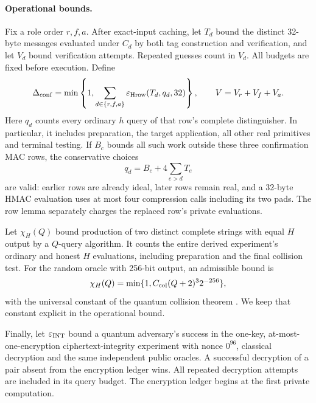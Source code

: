 \documentclass[pdflatex]{sn-jnl}
\theoremstyle{thmstyleone}
\theoremstyle{thmstylethree}
\theoremstyle{thmstyletwo}
\begin{document}
\paragraph{Operational bounds.}
Fix a role order $r,f,a$. After exact-input caching, let $T_d$ bound the
distinct 32-byte messages evaluated under $C_d$ by both tag construction
and verification, and let $V_d$ bound verification attempts. Repeated
guesses count in $V_d$. All budgets are fixed before execution. Define
\begin{equation}
 \Delta_{\rm conf}=\min\left\{1,
       \sum_{d\in\{r,f,a\}}
          \varepsilon_{\rm Hrow}(T_d,q_d,32)\right\},
 \qquad V=V_r+V_f+V_a.
\label{eq:confirmation-row-cost}
\end{equation}
Here $q_d$ counts every ordinary $h$ query of that row's complete
distinguisher. In particular, it includes preparation, the target
application, all other real primitives and terminal testing. If $B_c$
bounds all such work outside these three confirmation MAC rows, the
conservative choices
\[
 q_d=B_c+4\sum_{e>d}T_e
\]
are valid: earlier rows are already ideal, later rows remain real, and a
32-byte HMAC evaluation uses at most four compression calls including
its two pads. The row lemma separately charges the replaced row's
private evaluations.

Let $\chi_H(Q)$ bound production of two distinct complete strings with
equal $H$ output by a $Q$-query algorithm. It counts the entire derived
experiment's ordinary and honest $H$ evaluations, including preparation
and the final collision test. For the random oracle with 256-bit output,
an admissible bound is
\[
 \chi_H(Q)=\min\{1,C_{\rm col}(Q+2)^3 2^{-256}\},
\]
with the universal constant of the quantum collision theorem
\cite[Theorem~7]{zhandryCollision2015}. We keep that constant explicit
in the operational bound.

Finally, let $\varepsilon_{\rm INT}$ bound a quantum adversary's success
in the one-key, at-most-one-encryption ciphertext-integrity experiment
with nonce $0^{96}$, classical decryption and the same independent public
oracles. A successful decryption of a pair absent from the encryption
ledger wins. All repeated decryption attempts are included in its query
budget. The encryption ledger begins at the first private computation.
\end{document}
